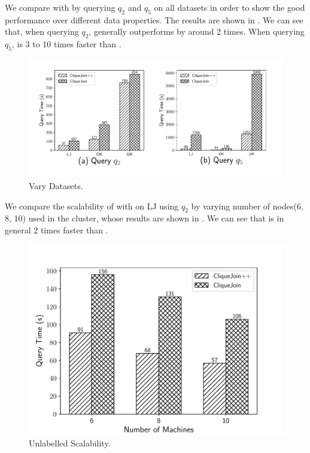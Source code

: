  We compare \gencliqjoin with \cliquejoin by querying $q_2$ and $q_5$ on all datasets in order to show the good performance over different data properties. The results are shown in . We can see that, when querying $q_2$, \gencliqjoin generally outperforms \cliquejoin by around 2 times. When querying $q_5$, \gencliqjoin is 3 to 10 times faster than \cliquejoin. 

\begin{figure}[htb]
  \flushleft
  \includegraphics[scale=0.35]{figures/exp2.pdf}
  \caption{\small{Vary Datasets.}}
  \label{fig:vary_dataset}
\end{figure}


 We compare the scalability of \gencliqjoin with \cliquejoin on LJ using $q_2$ by varying number of nodes(6, 8, 10) used in the cluster, whose results are shown in . We can see that \gencliqjoin is in general 2 times faster than \cliquejoin.

\begin{figure}[htb]
  \centering
  \includegraphics[scale=0.37]{figures/exp3.pdf}
  \caption{\small{Unlabelled Scalability.}}
  \label{fig:unl_sca}
\end{figure}


